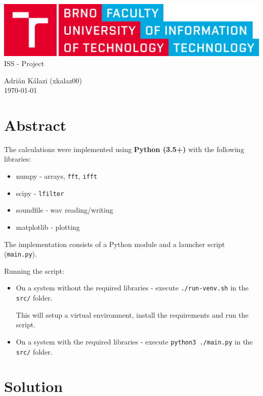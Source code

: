 \documentclass[a4paper, 11pt]{article}
\begin{document}
	\begin{center}
	{\includegraphics[width=0.4\linewidth]{fig/logo_en.png}}
		\\
		[0.4cm]

		{\LARGE
		ISS - Project \\
		[0.4cm]
		}

		{\large
		Adrián Kálazi (xkalaz00) \\
		\today
		}
	\end{center}

	\section*{Abstract}

	The calculations were implemented using \textbf{Python (3.5+)} with the following libraries:

	\begin{itemize}
		\item numpy - arrays, \texttt{fft}, \texttt{ifft}
		\item scipy - \texttt{lfilter}
		\item soundfile - wav reading/writing
		\item matplotlib - plotting
	\end{itemize}

	The implementation consists of a Python module and a launcher script (\texttt{main.py}).

	Running the script:
	\begin{itemize}
		\item
		On a system without the required libraries - execute \texttt{./run-venv.sh} in the \texttt{src/} folder.

		This will setup a virtual environment, install the requirements and run the script.
		\item
		On a system with the required libraries - execute \texttt{python3 ./main.py} in the \texttt{src/} folder.
	\end{itemize}

	\section*{Solution}
\end{document}
